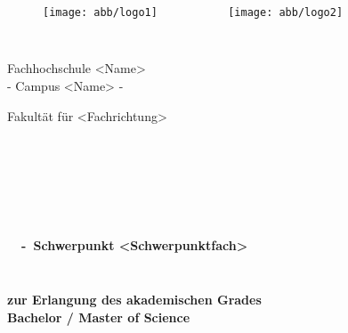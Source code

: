 \thispagestyle{empty}


\begin{figure}[t]
    \centering{}
    \texttt{[image: abb/logo1]}
    ~~~~~~~~~~ %
    \texttt{[image: abb/logo2]}
\end{figure}


\begin{verbatim}


\end{verbatim}

\begin{center}
    \Large{Fachhochschule <Name>}\\
    \Large{- Campus <Name> -}\\
\end{center}


\begin{center}
    \Large{Fakultät für <Fachrichtung>}
\end{center}
\begin{verbatim}




\end{verbatim}
\begin{center}
    \doublespacing{}
    \textbf{\LARGE{\titleDocument}}\\
    \singlespacing{}
    \begin{verbatim}

\end{verbatim}
    \textbf{{~\subjectDocument~-~Schwerpunkt <Schwerpunktfach>}}
\end{center}
\begin{verbatim}

\end{verbatim}
\begin{center}

\end{center}
\begin{verbatim}

\end{verbatim}
\begin{center}
    \textbf{zur Erlangung des akademischen Grades \\ Bachelor / Master of Science}
\end{center}
\begin{verbatim}






\end{verbatim}

